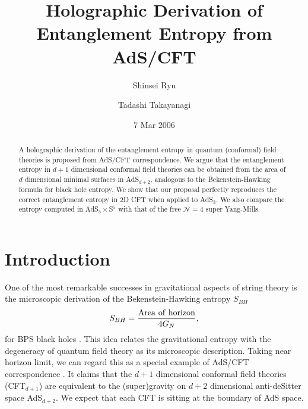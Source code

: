 \documentclass[amsmath,amssymb,nofootinbib,eqsecnum,tighten,prd,12pt]{revtex4}
\def\frac#1#2{{#1\over #2}}
\def\frac#1#2{{#1\over #2}}
\begin{document}
\title{Holographic Derivation of
Entanglement Entropy from AdS/CFT}

\author{Shinsei Ryu}
\author{Tadashi Takayanagi}
\date{7 Mar 2006}


\begin{abstract}
A holographic derivation of the entanglement entropy in quantum
(conformal) field theories is proposed from AdS/CFT correspondence.
We argue that the entanglement entropy in $d+1$ dimensional
conformal field theories can be obtained from the area of $d$
dimensional minimal surfaces in AdS$_{d+2}$, analogous to the
Bekenstein-Hawking formula for black hole entropy. We show that our
proposal perfectly reproduces the correct entanglement entropy in 2D
CFT when applied to AdS$_3$. We also compare the entropy computed in
AdS$_5\times$S$^5$ with that of the free ${\mathcal N}=4$ super
Yang-Mills.
\end{abstract}


\maketitle
\newpage


\section{Introduction}
\setcounter{section}{1}

One of the most remarkable successes in gravitational aspects of
string theory is the microscopic derivation of the
Bekenstein-Hawking entropy $S_{BH}$
\begin{equation}
S_{BH}=\frac{{\rm Area~of~horizon}}{4G_N},
\label{BHentropy}
\end{equation}
for BPS black holes \cite{StVa}. This idea relates the gravitational
entropy with the degeneracy of quantum field theory as its
microscopic description. Taking near horizon limit, we can regard
this as a special example of AdS/CFT correspondence
\cite{Maldacena,ADSGKP,ADSWitten}. It claims that the $d+1$
dimensional conformal field theories (CFT$_{d+1}$) are equivalent to
the (super)gravity on $d+2$ dimensional anti-deSitter space
AdS$_{d+2}$. We expect that each CFT is sitting at the boundary of
AdS space.
\end{document}
